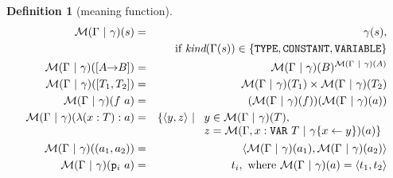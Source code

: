 \documentclass [12pt,twoside]{cslreport}
\newcommand{\thmbox}
   {{\ \hfill\hbox{%
      \vrule width1.0ex height1.0ex
   }\parfillskip 0pt }}
\newcommand{\tuple}[1]{\langle #1 \rangle}
\newcommand{\aro}{\mathord\rightarrow} %
\newcommand{\funtype}[2]{[#1 \aro #2]}
\newcommand{\tupletype}[1]{[#1]}
\newcommand{\Mgamma}[1]{{\mathcal M}(\Gamma\vbar\gamma)(#1)}
\newcommand{\proj}[1]{\mathtt{p}_{#1}}
\newcommand{\listwo}[2]{#1_{1}, #1_{2}}
\newcommand{\twob}{\mathbf{2}}
\newcommand{\oneb}{\mathbf{1}}
\newcommand{\zerob}{\mathbf{0}}
\newcommand{\reals}{\mathbf{R}}
\newcommand{\tttype}{\mathtt{TYPE}}
\newcommand{\ttvar}{\mathtt{VAR}}
\newcommand{\ttconstant}{\mathtt{CONSTANT}}
\newcommand{\ttvariable}{\mathtt{VARIABLE}}
\newcommand{\vbar}{\ |\ }
\newtheorem{definition}{Definition}
\newenvironment{Defn}[1]{\begin{definition}[#1]\label{defn:#1}}{
\thmbox\end{definition}}
\begin{document}
\begin{Defn}{meaning function}
\begin{eqnarray*}
  \mathcal{M}(\Gamma\vbar \gamma)(s) & = &  \gamma(s),\\
                    & &  \mbox{ if } 
\textit{kind}(\Gamma(s)) \in \{ \tttype{}, \ttconstant{}, \ttvariable \}
\\
%
  \mathcal{M}(\Gamma\vbar \gamma)(\funtype{A}{B}) & = & \Mgamma{B}^{\Mgamma{A}}\\
%
  \Mgamma{\tupletype{\listwo{T}{n}}} & = &  \Mgamma{T_1} \times %
\Mgamma{T_2} %
\\
%
\mathcal{M}(\Gamma\vbar \gamma)(f\ a) & = & (\mathcal{M}(\Gamma\vbar \gamma)(f))(\mathcal{M}(\Gamma\vbar \gamma)(a)) \\
%
\Mgamma{\lambda (x : T): a} & = & \{\tuple{y, z} \vbar \begin{array}[t]{l}
						       y\in\Mgamma{T},\\
                					z = \mathcal{M}(\Gamma, x: \ttvar{}\ T\vbar \gamma\{x\gets y\})(a)\}
						       \end{array}\\
%               
%
\Mgamma{(\listwo{a}{n})} & = & \tuple{\Mgamma{a_1},  \Mgamma{a_2}} \\
%
\Mgamma{\proj{i}\ a} & = & t_i, \mbox{ where } \Mgamma{a} =
\tuple{\listwo{t}{n}}
\end{eqnarray*}
\end{Defn}
\end{document}
